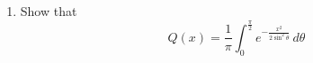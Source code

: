 \begin{enumerate}[label=\arabic*.,ref=\thesubsection.\theenumi]
\item
Show that
\begin{equation}
Q(x) = \frac{1}{\pi}\int^{\frac{\pi}{2}}_{0}e^{-\frac{x^2}{2\sin^2 \theta}}\,d\theta
\end{equation}

\end{enumerate}
